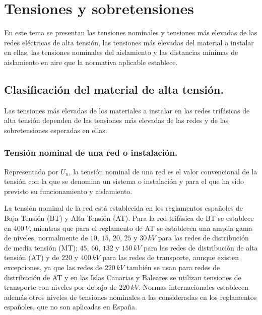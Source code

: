 \chapter{Tensiones y sobretensiones}
    En este tema se presentan las tensiones nominales y tensiones más elevadas de las redes eléctricas de alta tensión, las tensiones más elevadas del material a instalar en ellas, las tensiones nominales del aislamiento y las distancias mínimas de aislamiento en aire que la normativa aplicable establece.

    \section{Clasificación del material de alta tensión.}
        Las tensiones más elevadas de los materiales a instalar en las redes trifásicas de alta tensión dependen de las tensiones más elevadas de las redes y de las sobretensiones esperadas en ellas.

        \subsection{Tensión nominal de una red o instalación.}
            Representada por $U_\textit{n}$, la tensión nominal de una red es el valor convencional de la tensión con la que se denomina un sistema o instalación y para el que ha sido previsto su funcionamiento y aislamiento.\newline

            La tensión nominal de la red está establecida en los reglamentos españoles de Baja Tensión (BT) y Alta Tensión (AT). Para la red trifásica de BT se establece en $400\,\textit{V}$, mientras que para el reglamento de AT se establecen una amplia gama de niveles, normalmente de $10$, $15$, $20$, $25$ y $30\,\textit{kV}$ para las redes de distribución de media tensión (MT); $45$, $66$, $132$ y $150\,\textit{kV}$ para las redes de distribución de alta tensión (AT) y de $220$ y $400\,\textit{kV}$ para las redes de transporte, aunque existen excepciones, ya que las redes de $220\,\textit{kV}$ también se usan para redes de distribución de AT y en las Islas Canarias y Baleares se utilizan tensiones de transporte con niveles por debajo de $220\,\textit{kV}$. Normas internacionales establecen además otros niveles de tensiones nominales a las consideradas en los reglamentos españoles, que no son aplicadas en España.


